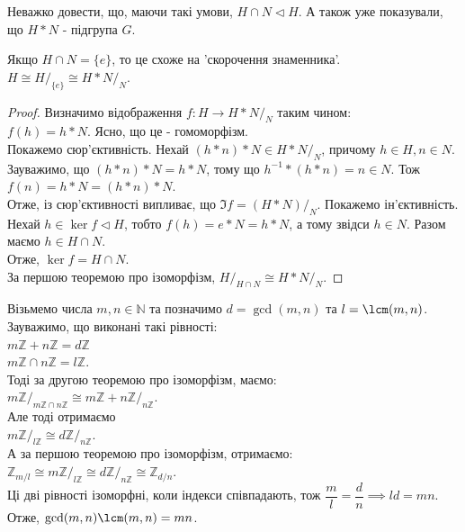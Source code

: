 \documentclass{math_library}
\begin{document}
\begin{remark}
Неважко довести, що, маючи такі умови, $H \cap N \triangleleft H$. А також уже показували, що $H*N$ - підгрупа $G$.
\end{remark}

\begin{remark}
Якщо $H \cap N = \{e\}$, то це схоже на 'скорочення знаменника'.\\
$H \cong H/_{\{e\}} \cong H*N/_{N}$.
\end{remark}

\begin{proof}
Визначимо відображення $f: H \to H*N/_{N}$ таким чином:\\
$f(h) = h*N$. Ясно, що це - гомоморфізм.\\
Покажемо сюр'єктивність. Нехай $(h*n)*N \in H*N/_{N}$, причому $h \in H, n \in N$. Зауважимо, що $(h*n)*N = h*N$, тому що $h^{-1}*(h*n) = n \in N$. Тож $f(n) = h*N = (h*n)*N$.\\
Отже, із сюр'єктивності випливає, що $\Im f = (H*N)/_N$.
Покажемо ін'єктивність. Нехай $h \in \ker f \triangleleft H$, тобто $f(h) = e*N = h*N$, а тому звідси $h \in N$. Разом маємо $h \in H \cap N$.\\
Отже, $\ker f = H \cap N$.\\
За першою теоремою про ізоморфізм, $H/_{H \cap N} \cong H*N/_{N}$.
\end{proof}

\begin{example}
Візьмемо числа $m,n \in \mathbb{N}$ та позначимо $d = \gcd(m,n)$ та $l = \lcm(m,n)$. Зауважимо, що виконані такі рівності:\\
$m \mathbb{Z} + n \mathbb{Z} = d \mathbb{Z}$\\
$m \mathbb{Z} \cap n \mathbb{Z} = l \mathbb{Z}$.\\
Тоді за другою теоремою про ізоморфізм, маємо:\\
$m \mathbb{Z}/_{m \mathbb{Z} \cap n \mathbb{Z}} \cong m \mathbb{Z} + n \mathbb{Z}/_{n \mathbb{Z}}$.\\
Але тоді отримаємо\\
$m \mathbb{Z}/_{l \mathbb{Z}} \cong d\mathbb{Z}/_{n \mathbb{Z}}$.\\
А за першою теоремою про ізоморфізм, отримаємо:\\
$\mathbb{Z}_{m/l} \cong  m \mathbb{Z}/_{l \mathbb{Z}} \cong d\mathbb{Z}/_{n \mathbb{Z}} \cong \mathbb{Z}_{d/n}$.\\
Ці дві рівності ізоморфні, коли індекси співпадають, тож $\dfrac{m}{l} = \dfrac{d}{n} \implies ld = mn$.\\
Отже, $\gcd(m,n) \lcm(m,n) = mn$.
\end{example}
\end{document}
